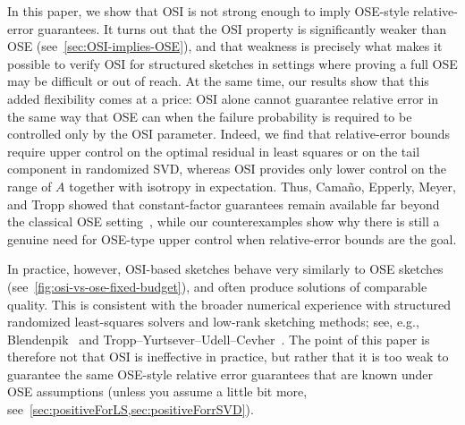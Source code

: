 \documentclass[onefignum,onetabnum]{siamart251216}
\begin{document}
In this paper, we show that OSI is not strong enough to imply OSE-style relative-error guarantees.  It turns out that the OSI property is significantly weaker than OSE (see~\cref{sec:OSI-implies-OSE}),  and that weakness is precisely what makes it possible to verify OSI for structured sketches in settings where proving a full OSE may be difficult or out of reach.  At the same time, our results show that this added flexibility comes at a price: OSI alone cannot guarantee relative error in the same way that OSE can when the failure probability is required to be controlled only by the OSI parameter. Indeed,  we find that relative-error bounds require upper control on the optimal residual in least squares or on the tail component in randomized SVD, whereas OSI provides only lower control on the range of $A$ together with isotropy in expectation.  Thus,  Cama\~no, Epperly, Meyer, and Tropp showed that constant-factor guarantees remain available far beyond the classical OSE setting~\cite{CamanoEtAl2025},  while our counterexamples show why there is still a genuine need for OSE-type upper control when relative-error bounds are the goal.

In practice,  however,  OSI-based sketches behave very similarly to OSE sketches (see~\cref{fig:osi-vs-ose-fixed-budget}), and often produce solutions of comparable quality.  This is consistent with the broader numerical experience with structured randomized least-squares solvers and low-rank sketching methods; see, e.g., Blendenpik~\cite{AvronMaymounkovToledo2010} and Tropp--Yurtsever--Udell--Cevher~\cite{TroppYurtseverUdellCevher2017}. The point of this paper is therefore not that OSI is ineffective in practice,  but rather that it is too weak to guarantee the same OSE-style relative error guarantees that are known under OSE assumptions (unless you assume a little bit more,  see~\cref{sec:positiveForLS,sec:positiveForrSVD}).
\end{document}

